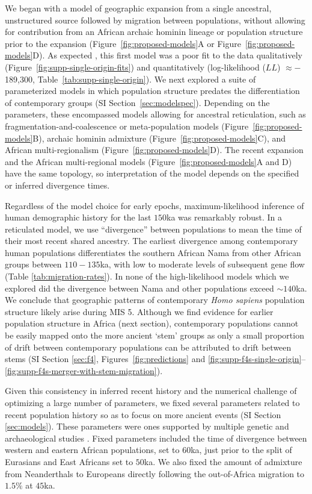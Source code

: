 \documentclass[]{article}
\begin{document}
We began with a model of geographic expansion from a single ancestral,
unstructured source followed by migration between populations, without allowing
for contribution from an African archaic hominin lineage or population
structure prior to the expansion (Figure~\ref{fig:proposed-models}A or
Figure~\ref{fig:proposed-models}D). As expected \citep{Ragsdale2019-nt}, this
first model was a poor fit to the data qualitatively
(Figure~\ref{fig:supp-single-origin-fits}) and quantitatively (log-likelihood
($LL$) $\approx-$189,300, Table~\ref{tab:supp-single-origin}). We next
explored a suite of parameterized models in which population structure predates
the differentiation of contemporary groups (SI
Section~\ref{sec:modelspec}). Depending on the parameters, these encompassed
models allowing for ancestral reticulation, such as
fragmentation-and-coalescence or meta-population models
(Figure~\ref{fig:proposed-models}B), archaic hominin admixture
(Figure~\ref{fig:proposed-models}C), and African multi-regionalism
(Figure~\ref{fig:proposed-models}D). The recent expansion and the African
multi-regional models (Figure~\ref{fig:proposed-models}A and D) have the same
topology, so interpretation of the model depends on the specified or inferred
divergence times.

Regardless of the model choice for early epochs, maximum-likelihood inference
of human demographic history for the last $150$ka was remarkably robust.  In a
reticulated model, we use ``divergence'' between populations to mean the time
of their most recent shared ancestry. The earliest divergence among
contemporary human populations differentiates the southern African Nama from
other African groups between $110-135$ka, with low to moderate levels of
subsequent gene flow (Table \ref{tab:migration-rates}). In none of the
high-likelihood models which we explored did the divergence between Nama and
other populations exceed $\sim140$ka. We conclude that geographic patterns of
contemporary \emph{Homo sapiens} population structure likely arise during MIS
5. Although we find evidence for earlier population structure in Africa (next
section), contemporary populations cannot be easily mapped onto the more
ancient `stem' groups as only a small proportion of drift between contemporary
populations can be attributed to drift between stems (SI Section \ref{sec:f4},
Figures~\ref{fig:predictions} and
\ref{fig:supp-f4s-single-origin}--\ref{fig:supp-f4s-merger-with-stem-migration}).

Given this consistency in inferred recent history and the numerical challenge
of optimizing a large number of parameters, we fixed several parameters related
to recent population history so as to focus on more ancient events (SI Section
\ref{sec:models}). These parameters were ones supported by multiple genetic and
archaeological studies \citep{Bergstrom2021-iw}.
Fixed parameters included the time of divergence
between western and eastern African populations, set to $60$ka, just prior to
the split of Eurasians and East Africans set to $50$ka. We also fixed the
amount of admixture from Neanderthals to Europeans directly following the
out-of-Africa migration to $1.5\%$ at $45$ka.
\end{document}
